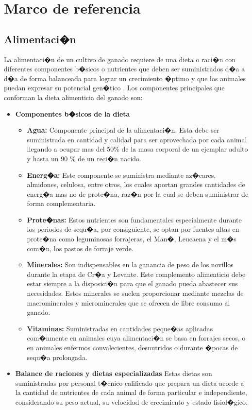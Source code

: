
\section{Marco de referencia}
\subsection{Alimentaci�n}
La alimentaci�n de un cultivo de ganado requiere de una dieta o raci�n con diferentes componentes b�sicos o nutrientes que deben ser suministrados d�a a d�a de forma balanceada para lograr un crecimiento �ptimo y que los animales puedan expresar su potencial gen�tico \cite{recomendaciones}. Los componentes principales que conforman la dieta alimenticia del ganado son:
	\begin{itemize}
	\item \textbf{Componentes b�sicos de la dieta} %
		\begin{itemize}
		\item \textbf{Agua:} Componente principal de la alimentaci�n. Esta debe ser suministrada en cantidad y calidad para ser aprovechada por cada animal llegando a ocupar mas del 50\% de la masa corporal de un ejemplar adulto y hasta un 90 \% de un reci�n nacido.
		\item \textbf{Energ�a:}  Este componente se suministra mediante az�cares, almidones, celulosa, entre otros, los cuales aportan grandes cantidades de energ�a mas no de prote�na, raz�n por la cual se deben suministrar de forma complementaria.
		\item \textbf{Prote�nas:} Estos nutrientes son fundamentales especialmente durante los periodos de sequ�a, por consiguiente, se optan por fuentes altas en prote�na como leguminosas forrajeras, el Man�, Leucaena y el m�s com�n, los pastos de forraje verde. 
		\item \textbf{Minerales:} Son indispensables en la ganancia de peso de los novillos durante la etapa de Cr�a y Levante. Este complemento alimenticio debe estar siempre a la disposici�n para que el ganado pueda abastecer sus necesidades. Estos minerales se suelen proporcionar mediante mezclas de macrominerales y microminerales que se ofrecen de libre consumo al ganado.
		\item \textbf{Vitaminas:} Suministradas en cantidades peque�as aplicadas com�nmente en animales cuya alimentaci�n se basa en forrajes secos,  o en animales enfermos convalecientes, desnutridos o durante �pocas de sequ�a prolongada.
		\end{itemize}
	\item \textbf{Balance de raciones y dietas especializadas} %
Estas dietas son suministradas por personal t�cnico calificado que prepara un dieta acorde a la cantidad de nutrientes de cada animal de forma particular e independiente, considerando su peso actual, su velocidad de crecimiento y estado fisiol�gico.
	\end{itemize}
	
